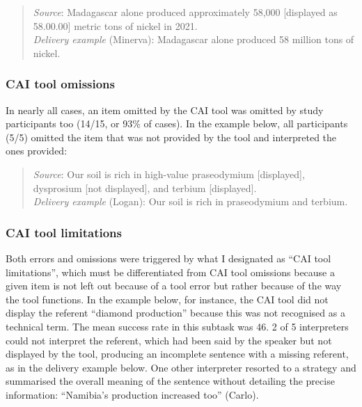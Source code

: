 \begin{quote}
\begin{sloppypar}
\textit{Source}: Madagascar alone produced approximately 58,000 [displayed as 58.00.00] metric tons of nickel in 2021.\\
\textit{Delivery example} (Minerva):  Madagascar alone produced 58 million tons of nickel.
\end{sloppypar}
\end{quote}




\subsubsection{CAI tool omissions}

In nearly all cases, an item omitted by the CAI tool was omitted by study participants too (14/15, or 93\% of cases). In the example below, all participants (5/5) omitted the item that was not provided by the tool and interpreted the ones provided:

\begin{quote}
\textit{Source}: Our soil is rich in high-value praseodymium [displayed], dysprosium [not displayed], and terbium [displayed].\\
\textit{Delivery example} (Logan): Our soil is rich in praseodymium and terbium.
\end{quote}

\subsubsection{CAI tool limitations}

Both errors and omissions were triggered by what I designated as ``CAI tool limitations'', which must be differentiated from CAI tool omissions because a given item is not left out because of a tool error but rather because of the way the tool functions. In the example below, for instance, the CAI tool did not display the referent ``diamond production'' because this was not recognised as a technical term. The mean success rate in this subtask was 46. 2 of 5 interpreters could not interpret the referent, which had been said by the speaker but not displayed by the tool, producing an incomplete sentence with a missing referent, as in the delivery example below. One other interpreter resorted to a strategy and summarised the overall meaning of the sentence without detailing the precise information: ``Namibia’s production increased too'' (Carlo).

